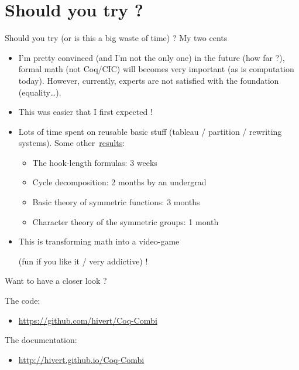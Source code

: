 \documentclass[compress,11pt]{beamer}
\begin{document}
\section{Should you try ?}

\begin{frame}{Should you try {\tiny(or is this a big waste of time)} ? My two cents}

  \begin{itemize}
  \item I'm pretty convinced (and I'm not the only one) in the future (how far
    ?), formal math (not Coq/CIC) will becomes very important (as is
    computation today). However, currently, experts are not satisfied with the
    foundation (equality\dots). \bigskip\pause

  \item This was easier that I first expected !
    \bigskip\pause

  \item Lots of time spent on reusable basic stuff (tableau / partition /
    rewriting systems). Some other~\href{file:html/index.html}{results}:
    \begin{itemize}
    \item The hook-length formulas: 3 weeks
    \item Cycle decomposition: 2 months by an undergrad
    \item Basic theory of symmetric functions: 3 months
    \item Character theory of the symmetric groups: 1 month
    \end{itemize}
    \bigskip\pause

  \item This is transforming math into a video-game

    (fun if you like it / very addictive) !
  \end{itemize}
\end{frame}

\begin{frame}{Want to have a closer look ?}
  \Large

  The code:\\
  \begin{itemize}
  \item \url{https://github.com/hivert/Coq-Combi}
  \end{itemize}
  \bigskip  \bigskip

  The documentation:\\
  \begin{itemize}
  \item \url{http://hivert.github.io/Coq-Combi}
  \end{itemize}
\end{frame}
\end{document}
